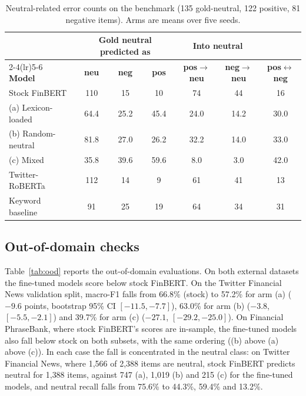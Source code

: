 \documentclass{aims}
\numberwithin{equation}{section}
\begin{document}
\begin{table}[ht]
\centering
\caption{Neutral-related error counts on the benchmark (135 gold-neutral, 122
positive, 81 negative items). Arms are means over five seeds.}
\label{tab:neuerr}
\small
\begin{tabular}{lcccccc}
\toprule
 & \multicolumn{3}{c}{\textbf{Gold neutral predicted as}} & \multicolumn{2}{c}{\textbf{Into neutral}} & \\
\cmidrule(lr){2-4}\cmidrule(lr){5-6}
\textbf{Model} & \textbf{neu} & \textbf{neg} & \textbf{pos} & \textbf{pos$\to$neu} & \textbf{neg$\to$neu} & \textbf{pos$\leftrightarrow$neg} \\
\midrule
Stock FinBERT & 110 & 15 & 10 & 74 & 44 & 16 \\
(a) Lexicon-loaded & 64.4 & 25.2 & 45.4 & 24.0 & 14.2 & 30.0 \\
(b) Random-neutral & 81.8 & 27.0 & 26.2 & 32.2 & 14.0 & 33.0 \\
(c) Mixed & 35.8 & 39.6 & 59.6 & 8.0 & 3.0 & 42.0 \\
Twitter-RoBERTa & 112 & 14 & 9 & 61 & 41 & 13 \\
Keyword baseline & 91 & 25 & 19 & 64 & 34 & 31 \\
\bottomrule
\end{tabular}
\end{table}

\subsection{Out-of-domain checks}
Table~\ref{tab:ood} reports the out-of-domain evaluations. On both external datasets
the fine-tuned models score below stock FinBERT. On the Twitter Financial News
validation split, macro-F1 falls from 66.8\% (stock) to 57.2\% for arm (a)
($-9.6$ points, bootstrap 95\% CI $[-11.5, -7.7]$), 63.0\% for arm (b) ($-3.8$,
$[-5.5, -2.1]$) and 39.7\% for arm (c) ($-27.1$, $[-29.2, -25.0]$). On Financial
PhraseBank, where stock FinBERT's scores are in-sample, the fine-tuned models also
fall below stock on both subsets, with the same ordering ((b) above (a) above (c)).
In each case the fall is concentrated in the neutral class: on Twitter Financial
News, where 1{,}566 of 2{,}388 items are neutral, stock FinBERT predicts neutral for
1{,}388 items, against 747 (a), 1{,}019 (b) and 215 (c) for the fine-tuned models,
and neutral recall falls from 75.6\% to 44.3\%, 59.4\% and 13.2\%.
\end{document}

